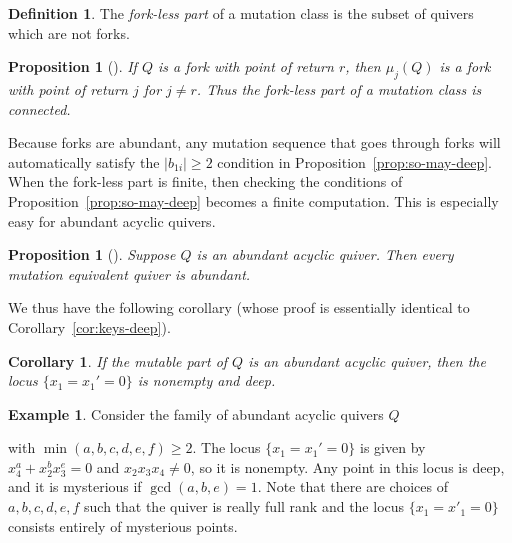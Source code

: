 \documentclass{amsart}
\numberwithin{equation}{section}
\newtheorem{proposition}[theorem]{Proposition}
\newtheorem{corollary}[theorem]{Corollary}
\theoremstyle{definition}
\newtheorem{definition}[theorem]{Definition}
\newtheorem{example}[theorem]{Example}
\begin{document}
\begin{definition}
The \emph{fork-less part} of a mutation class is the subset of quivers which are not forks.
\end{definition}

\begin{proposition}[{\cite[Lemma 2.8, Corollary 4.5]{warkentinThesis}}]\label{prop:tree-lem}
If $Q$ is a fork with point of return $r$, then $\mu_j(Q)$ is a fork with point of return $j$ for $j \neq r$.
Thus the fork-less part of a mutation class is connected.
\end{proposition}

Because forks are abundant, any mutation sequence that goes through forks will automatically satisfy the $|b_{1i}|\geq 2$ condition in Proposition~\ref{prop:so-may-deep}.
When the fork-less part is finite, then checking the conditions of Proposition~\ref{prop:so-may-deep} becomes a finite computation.
This is especially easy for abundant acyclic quivers.

\begin{proposition}[{\cite[Lemmas 2.5 and 2.8]{warkentinThesis}}]\label{def:abundance-for-acyclic}
Suppose $Q$ is an abundant acyclic quiver. Then every mutation equivalent quiver is abundant.
\end{proposition}

We thus have the following corollary (whose proof is essentially identical to Corollary~\ref{cor:keys-deep}).

\begin{corollary}\label{cor:abundant-acyclic-deep}
If the mutable part of $Q$ is an abundant acyclic quiver,
then the locus $\{x_1=x_1'=0\}$ is nonempty and deep. 
\end{corollary}

\begin{example}
Consider the family of abundant acyclic quivers $Q$

\begin{center}
\end{center}
with $\min(a,b,c,d,e,f) \geq 2$. The locus $\{x_1 = x_1' = 0\}$ is given by $x_4^{a} + x_2^{b}x_3^{e} = 0$ and $x_2x_3x_4 \neq 0$, so it is nonempty. Any point in this locus is deep, and it is mysterious if $\gcd(a,b,e) = 1$. Note that there are choices of $a,b,c,d,e,f$ such that the quiver is really full rank and the locus $\{x_1 = x'_1 = 0\}$ consists entirely of mysterious points.
\end{example}
\end{document}

